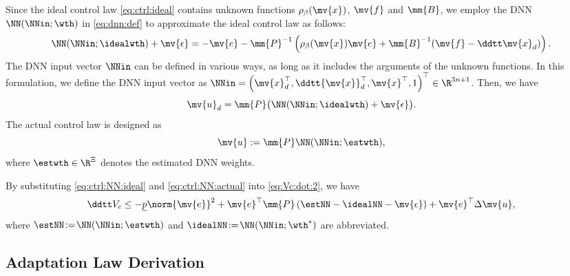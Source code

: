 \documentclass[letterpaper, journal]{IEEEtran}
\begin{document}
Since the ideal control law \eqref{eq:ctrl:ideal} contains unknown functions $\rho_{\beta}(\mv{x})$, $\mv{f}$ and $\mm{B}$, we employ the DNN $\NN(\NNin;\wth)$ in \eqref{eq:dnn:def} to approximate the ideal control law as follows:
\begin{equation*}
  \NN(\NNin;\idealwth)
  +
  \mv{\epsilon}
  =
  -\mv{e}
  -
  \mm{P}^{-1}
  \left(
  \rho_{\beta}(\mv{x})
  \mv{e}
  +
  \mm{B}^{-1}
  (
    \mv{f}
    -
    \ddtt \mv{x}_d
  )
  \right)
  .
\end{equation*}
The DNN input vector $\NNin$ can be defined in various ways, as long as it includes the arguments of the unknown functions.
In this formulation, we define the DNN input vector as
$
  \NNin 
  = 
  \left(
    \mv{x}_d^\top, 
    \ddtt{\mv{x}}_d^\top, 
    \mv{x}^\top, 
    1 
  \right)^\top
  \in\R^{3n+1}
$.
Then, we have 
\begin{equation} \label{eq:ctrl:NN:ideal}
  \mv{u}_d
  =
  \mm{P}
  \big(
    \NN(\NNin;\idealwth)
    +
    \mv{\epsilon}
  \big)
  .
\end{equation}
The actual control law is designed as 
\begin{equation} \label{eq:ctrl:NN:actual}
  \mv{u}
  :=
  \mm{P}
  \NN(\NNin;\estwth)
  ,
\end{equation}
where $\estwth\in\R^{\Xi}$ denotes the estimated DNN weights.

By substituting \eqref{eq:ctrl:NN:ideal} and \eqref{eq:ctrl:NN:actual} into \eqref{eq:Vc:dot:2}, we have
\begin{equation} \label{eq:Vc:dot:3}
  \ddtt V_c
  \le
  - \underline{p}
  \norm{\mv{e}}^2
  +
  \mv{e}^\top\mm{P}
  \left(
    \estNN - \idealNN
    - \mv{\epsilon}
  \right)
  +
  \mv{e}^\top
  \Delta\mv{u}
  ,
\end{equation}
where $\estNN\!:=\!\NN(\NNin;\estwth)$ and $\idealNN\!:=\!\NN(\NNin;\wth^*)$ are abbreviated.

\subsection{Adaptation Law Derivation} \label{sec:main:result:sub:adap:laws}
\end{document}
